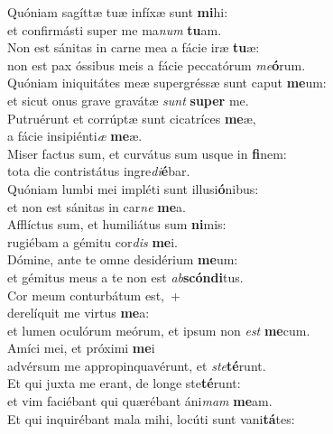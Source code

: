 \evenverse Quóniam sagíttæ tuæ infíxæ sunt \textbf{mi}hi:~\*\\
\evenverse et confirmásti super me ma\textit{num} \textbf{tu}am.\\
\oddverse Non est sánitas in carne mea a fácie iræ \textbf{tu}æ:~\*\\
\oddverse non est pax óssibus meis a fácie peccatórum \textit{me}\textbf{ó}rum.\\
\evenverse Quóniam iniquitátes meæ supergréssæ sunt caput \textbf{me}um:~\*\\
\evenverse et sicut onus grave gravátæ \textit{sunt} \textbf{su}\textbf{per} me.\\
\oddverse Putruérunt et corrúptæ sunt cicatríces \textbf{me}æ,~\*\\
\oddverse a fácie insipiénti\textit{æ} \textbf{me}æ.\\
\evenverse Miser factus sum, et curvátus sum usque in \textbf{fi}nem:~\*\\
\evenverse tota die contristátus ingre\textit{di}\textbf{é}bar.\\
\oddverse Quóniam lumbi mei impléti sunt illusi\textbf{ó}nibus:~\*\\
\oddverse et non est sánitas in car\textit{ne} \textbf{me}a.\\
\evenverse Afflíctus sum, et humiliátus sum \textbf{ni}mis:~\*\\
\evenverse rugiébam a gémitu cor\textit{dis} \textbf{me}i.\\
\oddverse Dómine, ante te omne desidérium \textbf{me}um:~\*\\
\oddverse et gémitus meus a te non est \textit{ab}\textbf{scón}\textbf{di}tus.\\
\evenverse Cor meum conturbátum est,~+\\
\evenverse  derelíquit me virtus \textbf{me}a:~\*\\
\evenverse et lumen oculórum meórum, et ipsum non \textit{est} \textbf{me}cum.\\
\oddverse Amíci mei, et próximi \textbf{me}i~\*\\
\oddverse advérsum me appropinquavérunt, et \textit{ste}\textbf{té}runt.\\
\evenverse Et qui juxta me erant, de longe ste\textbf{té}runt:~\*\\
\evenverse et vim faciébant qui quærébant áni\textit{mam} \textbf{me}am.\\
\oddverse Et qui inquirébant mala mihi, locúti sunt vani\textbf{tá}tes:~\*\\
